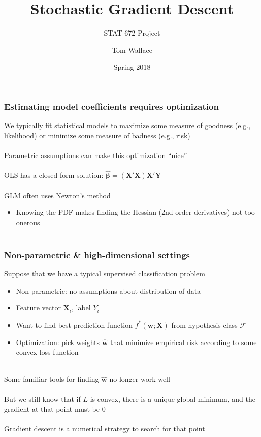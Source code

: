 \documentclass{beamer}
\title{Stochastic Gradient Descent}
\subtitle{STAT 672 Project}
\author{Tom Wallace}
\institute{George Mason University}
\date{Spring 2018}
\begin{document}
\frame{\titlepage}


\begin{frame}
	\frametitle{Estimating model coefficients requires optimization}
	We typically fit statistical models to maximize some measure of goodness
	(e.g., likelihood) or minimize some measure of badness (e.g., risk)
	\\~\\

	Parametric assumptions can make this optimization ``nice'' \\~\\

	OLS has a closed form solution: $\hat{\bm{\beta}} =
	(\bm{X}'\bm{X})\bm{X}'\bm{Y}$ \\~\\

	GLM often uses Newton's method
	\begin{itemize}
		\item \small Knowing the PDF makes finding the
			Hessian (2nd order derivatives) not too onerous \\~\\
	\end{itemize}

\end{frame}

\begin{frame}
	\frametitle{Non-parametric \& high-dimensional settings}
	Suppose that we have a typical supervised classification problem
	\begin{itemize}
		\item \small Non-parametric: no assumptions about distribution of data
		\item Feature vector $\mathbf{X}_i$, label $Y_i$
		\item Want to find best prediction function $f^*(\bm{w}; \bm{X})$ from
			hypothesis class $\mathcal{F}$
		\item Optimization: pick weights $\hat{\bm{w}}$ that minimize
			empirical risk according to some convex
			loss function \\~\\
	\end{itemize}

	Some familiar tools for finding $\hat{\mathbf{w}}$ no longer work well
	\\~\\

	But we still know that if $L$ is convex, there is a unique global
	minimum, and the gradient at that point must be 0 \\~\\

	Gradient descent is a numerical strategy to search for that point
\end{frame}
\end{document}
